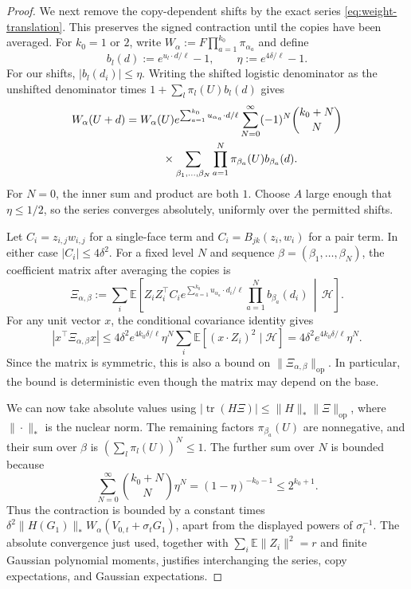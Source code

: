\documentclass[11pt,letterpaper]{article}
\theoremstyle{remark}
\newcommand{\E}{\mathbb E}
\newcommand{\tr}{\operatorname{tr}}
\newcommand{\op}{\mathrm{op}}
\begin{document}
\begin{proof}
We next remove the copy-dependent shifts by the exact series
\eqref{eq:weight-translation}. This preserves the signed
contraction until the copies have been averaged.
For $k_0=1$ or $2$, write
$W_\alpha:=F\prod_{a=1}^{k_0}\pi_{\alpha_a}$ and define
\[
 b_l(d):=e^{u_l\cdot d/\ell}-1,\qquad
 \eta:=e^{4\delta/\ell}-1.
\]
For our shifts, $|b_l(d_i)|\le\eta$.
Writing the shifted logistic denominator as the unshifted
denominator times $1+\sum_l\pi_l(U)b_l(d)$ gives
\[
 \begin{split}
 W_\alpha(U+d)
 ={}&W_\alpha(U)e^{\sum_{a=1}^{k_0}u_{\alpha_a}\cdot d/\ell}
 \sum_{N=0}^\infty(-1)^N\binom{k_0+N}{N}\\
 &\hspace{7mm}\times
 \sum_{\beta_1,\ldots,\beta_N}
       \prod_{a=1}^N\pi_{\beta_a}(U)b_{\beta_a}(d).
 \end{split}
\]
For $N=0$, the inner sum and product are both $1$.
Choose $A$ large enough that $\eta\le1/2$, so the series
converges absolutely, uniformly over the permitted shifts.

Let $C_i=z_{i,j}w_{i,j}$ for a single-face term and
$C_i=B_{jk}(z_i,w_i)$ for a pair term. In either case
$|C_i|\le4\delta^2$. For a fixed level $N$ and sequence
$\beta=(\beta_1,\ldots,\beta_N)$, the coefficient matrix
after averaging the copies is
\[
 \Xi_{\alpha,\beta}:=
 \sum_i\E\!\left[
 Z_iZ_i^\top C_i
 e^{\sum_{a=1}^{k_0}u_{\alpha_a}\cdot d_i/\ell}
 \prod_{a=1}^N b_{\beta_a}(d_i)
 \,\middle|\,\mathcal H\right].
\]
For any unit vector $x$, the conditional covariance identity gives
\[
 |x^\top\Xi_{\alpha,\beta}x|
 \le4\delta^2e^{4k_0\delta/\ell}\eta^N
       \sum_i\E[(x\cdot Z_i)^2\mid\mathcal H]
 =4\delta^2e^{4k_0\delta/\ell}\eta^N.
\]
Since the matrix is symmetric, this is also a bound on
$\|\Xi_{\alpha,\beta}\|_{\op}$. In particular, the bound
is deterministic even though the matrix may depend on the base.

We can now take absolute values using
$|\tr(H\Xi)|\le\|H\|_*\|\Xi\|_{\op}$, where
$\|\cdot\|_*$ is the nuclear norm. The remaining factors
$\pi_{\beta_a}(U)$ are nonnegative, and their sum over
$\beta$ is $(\sum_l\pi_l(U))^N\le1$.
The further sum over $N$ is bounded because
\[
 \sum_{N=0}^\infty\binom{k_0+N}{N}\eta^N
 =(1-\eta)^{-k_0-1}\le2^{k_0+1}.
\]
Thus the contraction is bounded by a constant times
$\delta^2\|H(G_1)\|_*W_\alpha(V_{0,t}+\sigma_tG_1)$,
apart from the displayed powers of $\sigma_t^{-1}$.
The absolute convergence just used, together with
$\sum_i\E\|Z_i\|^2=r$ and finite Gaussian polynomial
moments, justifies interchanging the series, copy expectations,
and Gaussian expectations.


\end{proof}
\end{document}
